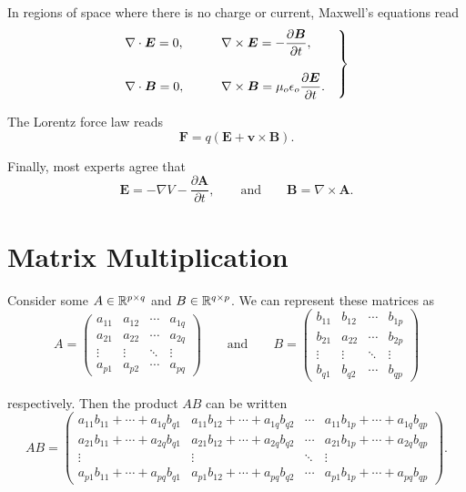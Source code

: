\documentclass{article}
\begin{document}
In regions of space where there is no charge or current, Maxwell's equations read
\begin{equation*}
	\begin{rcases} \displaystyle \nabla \cdot \bm{E} = 0,& \qquad \displaystyle \nabla \times \bm{E} = -\frac{\partial \bm{B}}{\partial t}, \\[1em] \displaystyle \nabla \cdot \bm{B} = 0,& \qquad \displaystyle \nabla \times \bm{B} = \mu_o \epsilon_o \frac{\partial \bm{E}}{\partial t}.\quad \end{rcases}
\end{equation*}

The Lorentz force law reads
\begin{equation*}
    \bm{F} = q \left( \bm{E} + \bm{v} \times \bm{B} \right).
\end{equation*}

Finally, most experts agree that
\begin{equation*}
    \bm{E} = -\nabla V - \frac{\partial \bm{A}}{\partial t}, \qquad \text{and} \qquad \bm{B} = \nabla \times \bm{A}.
\end{equation*}

\section{Matrix Multiplication}

Consider some $A \in \mathbb{R}^{p \times q}$ and $B \in \mathbb{R}^{q \times p}$. We can represent these matrices as
\begin{equation*}
    A = \begin{pmatrix} a_{11} & a_{12} & \cdots & a_{1q} \\ a_{21} & a_{22} & \cdots & a_{2q} \\ \vdots & \vdots & \ddots & \vdots \\ a_{p1} & a_{p2} & \cdots & a_{pq} \end{pmatrix} \qquad \text{and} \qquad B = \begin{pmatrix} b_{11} & b_{12} & \cdots & b_{1p} \\ b_{21} & a_{22} & \cdots & b_{2p} \\ \vdots & \vdots & \ddots & \vdots \\ b_{q1} & b_{q2} & \cdots & b_{qp} \end{pmatrix}
\end{equation*}

respectively. Then the product $AB$ can be written
\begin{equation*}
    AB = \begin{pmatrix} a_{11} b_{11} + \cdots + a_{1q} b_{q1} & a_{11} b_{12} + \cdots + a_{1q} b_{q2} & \cdots & a_{11} b_{1p} + \cdots + a_{1q} b_{qp} \\ a_{21} b_{11} + \cdots + a_{2q} b_{q1} & a_{21} b_{12} + \cdots + a_{2q} b_{q2} & \cdots & a_{21} b_{1p} + \cdots + a_{2q} b_{qp} \\ \vdots & \vdots & \ddots & \vdots \\ a_{p1} b_{11} + \cdots + a_{pq} b_{q1} & a_{p1} b_{12} + \cdots + a_{pq} b_{q2} & \cdots & a_{p1} b_{1p} + \cdots + a_{pq} b_{qp} \end{pmatrix}.
\end{equation*}
\end{document}
